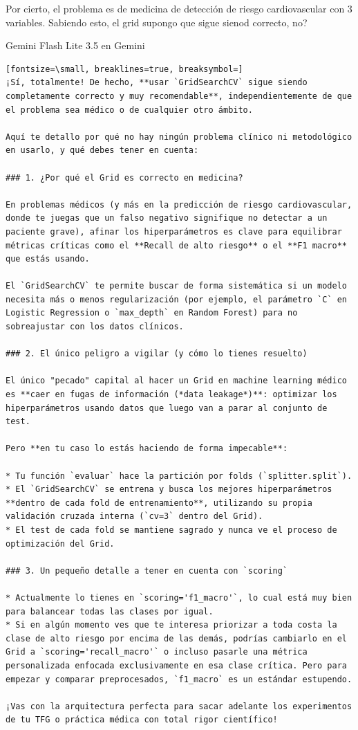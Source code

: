 \documentclass[12pt,a4paper,oneside]{book}
\begin{document}
\begin{iaprompt}
Por cierto, el problema es de medicina de detección de riesgo cardiovascular con 3 variables. Sabiendo esto, el grid supongo que sigue sienod correcto, no?
\end{iaprompt}
\begin{iaresp}{Gemini Flash Lite 3.5 en Gemini}
\begin{Verbatim}[fontsize=\small, breaklines=true, breaksymbol=]
¡Sí, totalmente! De hecho, **usar `GridSearchCV` sigue siendo completamente correcto y muy recomendable**, independientemente de que el problema sea médico o de cualquier otro ámbito.

Aquí te detallo por qué no hay ningún problema clínico ni metodológico en usarlo, y qué debes tener en cuenta:

### 1. ¿Por qué el Grid es correcto en medicina?

En problemas médicos (y más en la predicción de riesgo cardiovascular, donde te juegas que un falso negativo signifique no detectar a un paciente grave), afinar los hiperparámetros es clave para equilibrar métricas críticas como el **Recall de alto riesgo** o el **F1 macro** que estás usando.

El `GridSearchCV` te permite buscar de forma sistemática si un modelo necesita más o menos regularización (por ejemplo, el parámetro `C` en Logistic Regression o `max_depth` en Random Forest) para no sobreajustar con los datos clínicos.

### 2. El único peligro a vigilar (y cómo lo tienes resuelto)

El único "pecado" capital al hacer un Grid en machine learning médico es **caer en fugas de información (*data leakage*)**: optimizar los hiperparámetros usando datos que luego van a parar al conjunto de test.

Pero **en tu caso lo estás haciendo de forma impecable**:

* Tu función `evaluar` hace la partición por folds (`splitter.split`).
* El `GridSearchCV` se entrena y busca los mejores hiperparámetros **dentro de cada fold de entrenamiento**, utilizando su propia validación cruzada interna (`cv=3` dentro del Grid).
* El test de cada fold se mantiene sagrado y nunca ve el proceso de optimización del Grid.

### 3. Un pequeño detalle a tener en cuenta con `scoring`

* Actualmente lo tienes en `scoring='f1_macro'`, lo cual está muy bien para balancear todas las clases por igual.
* Si en algún momento ves que te interesa priorizar a toda costa la clase de alto riesgo por encima de las demás, podrías cambiarlo en el Grid a `scoring='recall_macro'` o incluso pasarle una métrica personalizada enfocada exclusivamente en esa clase crítica. Pero para empezar y comparar preprocesados, `f1_macro` es un estándar estupendo.

¡Vas con la arquitectura perfecta para sacar adelante los experimentos de tu TFG o práctica médica con total rigor científico!
\end{Verbatim}
\end{iaresp}
\end{document}
